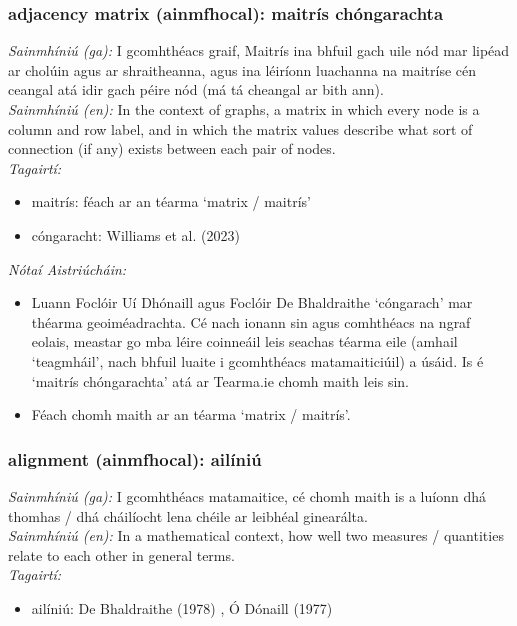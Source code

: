\subsubsection*{adjacency matrix (ainmfhocal): maitrís chóngarachta}
 \noindent \textit{Sainmhíniú (ga):} I gcomhthéacs graif, Maitrís ina bhfuil gach uile nód mar lipéad ar cholúin agus ar shraitheanna, agus ina léiríonn luachanna na maitríse cén ceangal atá idir gach péire nód (má tá cheangal ar bith ann).
\\
 \noindent \textit{Sainmhíniú (en):} In the context of graphs, a matrix in which every node is a column and row label, and in which the matrix values describe what sort of connection (if any) exists between each pair of nodes. 
\\
 \noindent \textit{Tagairtí:}
\begin{itemize}
	\item maitrís: féach ar an téarma `matrix / maitrís'
	\item cóngaracht: Williams et al. (2023) \cite{storchiste}
\end{itemize}

 \noindent \textit{Nótaí Aistriúcháin:}
\begin{itemize}
	\item Luann Foclóir Uí Dhónaill agus Foclóir De Bhaldraithe `cóngarach' mar théarma geoiméadrachta. Cé nach ionann sin agus comhthéacs na ngraf eolais, meastar go mba léire coinneáil leis seachas téarma eile (amhail `teagmháil', nach bhfuil luaite i gcomhthéacs matamaiticiúil) a úsáid. Is é `maitrís chóngarachta' atá ar Tearma.ie chomh maith leis sin.
	\item Féach chomh maith ar an téarma `matrix / maitrís'.
\end{itemize}


\subsubsection*{alignment (ainmfhocal): ailíniú}
 \noindent \textit{Sainmhíniú (ga):} I gcomhthéacs matamaitice, cé chomh maith is a luíonn dhá thomhas / dhá cháilíocht lena chéile ar leibhéal ginearálta.
\\
 \noindent \textit{Sainmhíniú (en):} In a mathematical context, how well two measures / quantities relate to each other in general terms.
\\
 \noindent \textit{Tagairtí:}
\begin{itemize}
	\item ailíniú: De Bhaldraithe (1978) \cite{de-bhaldraithe}, Ó Dónaill (1977) \cite{odonaill}
\end{itemize}


